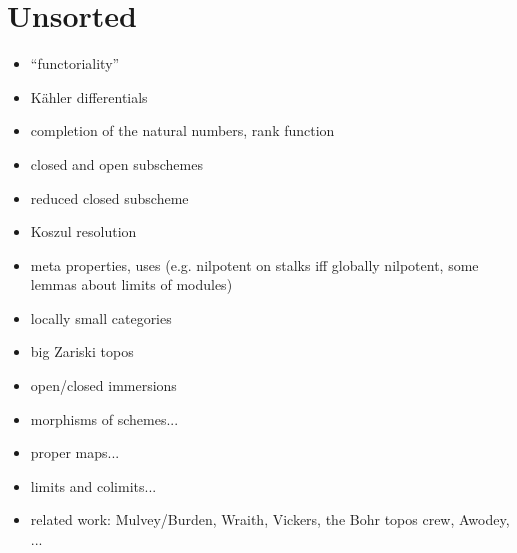 \documentclass[10pt]{amsart}
\theoremstyle{definition}
\theoremstyle{plain}
\theoremstyle{remark}
\newcommand{\?}{\,{:}\,}
\renewcommand{\_}{\mathpunct{.}\,}
\begin{document}
\section{Unsorted}
\begin{itemize}
\item ``functoriality''
\item Kähler differentials
\item completion of the natural numbers, rank function
\item closed and open subschemes
\item reduced closed subscheme
\item Koszul resolution
\item meta properties, uses (e.g. nilpotent on stalks iff globally nilpotent,
some lemmas about limits of modules)
\item locally small categories
\item big Zariski topos
\item open/closed immersions
\item morphisms of schemes...
\item proper maps...
\item limits and colimits...
\item related work: Mulvey/Burden, Wraith, Vickers, the Bohr topos crew, Awodey, ...
\end{itemize}
\end{document}
